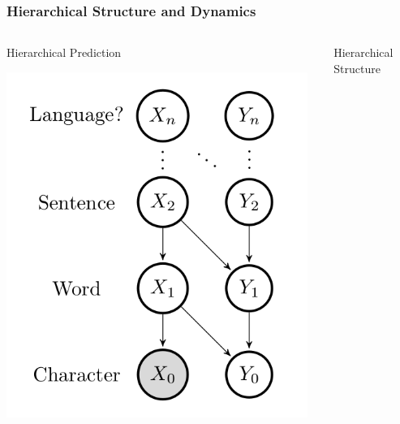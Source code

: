 \begin{frame}
  \frametitle{Hierarchical Structure and Dynamics}
  \begin{columns}
    \begin{column}{0.5\textwidth}
      \begin{block}{Hierarchical Prediction}
        \begin{center}
          \includegraphics[width=0.97\textwidth]{images/idyot-seqmem-graph-model.png}
        \end{center}
      \end{block}
    \end{column}
    \begin{column}{0.5\textwidth}
      \begin{block}{Hierarchical Structure}
        \begin{center}

\end{center}
\end{block}
\end{column}
\end{columns}
\end{frame}
